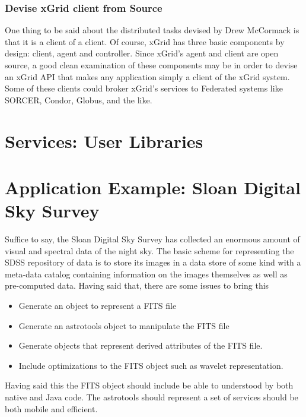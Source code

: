 \documentclass[11pt]{article}
\begin{document}
\subsubsection {Devise xGrid client from Source}
One thing to be said about the distributed tasks devised by Drew McCormack is that it is a client of a client.  Of course, xGrid has three basic components by design: client, agent and controller.  Since xGrid's agent and client are open source, a good clean examination of these components may be in order to devise an xGrid API that makes any application simply a client of the xGrid system.  Some of these clients could broker xGrid's services to Federated systems like SORCER, Condor, Globus, and the like.  

 
 \section {Services: User Libraries}
 
 \section {Application Example:  Sloan Digital Sky Survey}  
 Suffice to say, the Sloan Digital Sky Survey has collected an enormous amount of visual and spectral data of the night sky.    The basic scheme for representing the SDSS repository of data is to store its images in a data store of some kind with a meta-data catalog containing information on the images themselves as well as pre-computed data.    Having said that, there are some issues to bring this 
 \begin{itemize}
\item Generate an object to represent a FITS file
\item Generate an astrotools object to manipulate the FITS file
\item Generate objects that represent derived attributes of the FITS file.
\item Include optimizations to the FITS object such as wavelet representation. 
\end{itemize}

 Having said this the FITS object should include be able to understood by both native and Java code.  The astrotools should represent a set of services should be both mobile and efficient.  
\end{document}
